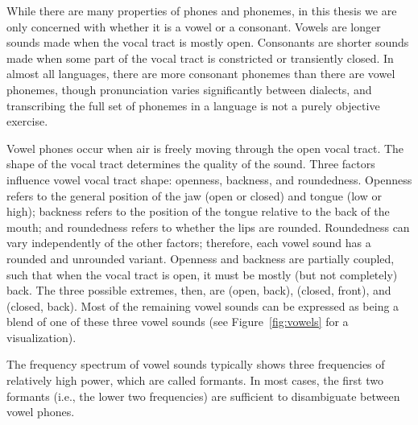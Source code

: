 While there are many properties
of phones and phonemes,
in this thesis we are only concerned
with whether it
is a vowel or a consonant.
Vowels are longer sounds
made when the vocal tract is mostly open.
Consonants are shorter sounds
made when some part of the vocal tract
is constricted or transiently closed.
In almost all languages,
there are more consonant phonemes
than there are vowel phonemes,
though pronunciation varies significantly
between dialects,
and transcribing the full set of
phonemes in a language is
not a purely objective exercise.

Vowel phones occur when air is freely
moving through the open vocal tract.
The shape of the vocal tract determines
the quality of the sound.
Three factors influence vowel vocal tract shape:
openness, backness, and roundedness.
Openness refers to the general position
of the jaw (open or closed) and tongue (low or high);
backness refers to the position of the
tongue relative to the back of the mouth;
and roundedness refers to
whether the lips are rounded.
Roundedness can vary independently
of the other factors;
therefore, each vowel sound has a rounded
and unrounded variant.
Openness and backness are partially coupled,
such that when the vocal tract is open,
it must be mostly (but not completely) back.
The three possible extremes, then,
are \ipa{[A]} (open, back),
\ipa{[i]} (closed, front),
and \ipa{[u]} (closed, back).
Most of the remaining vowel sounds
can be expressed as being
a blend of one of these three vowel sounds
(see Figure~\ref{fig:vowels} for a visualization).

The frequency spectrum of vowel sounds
typically shows three frequencies
of relatively high power,
which are called formants.
In most cases, the first two formants
(i.e., the lower two frequencies)
are sufficient to disambiguate
between vowel phones.

